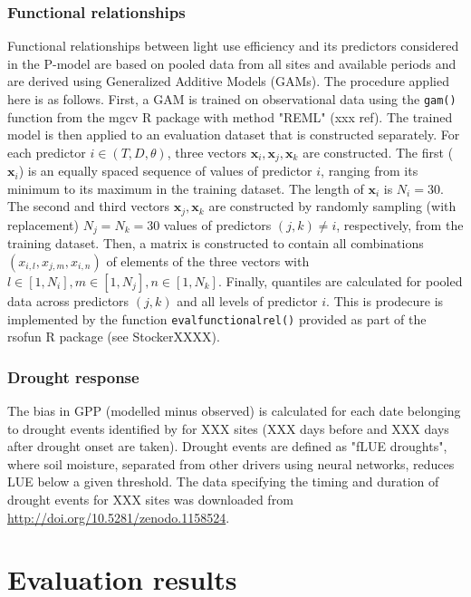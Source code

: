 \documentclass{myreport}
\begin{document}
\subsubsection{Functional relationships}
\label{sec:gam}

Functional relationships between light use efficiency and its predictors considered in the P-model are based on pooled data from all sites and available periods and are derived using Generalized Additive Models (GAMs). The procedure applied here is as follows. First, a GAM is trained on observational data using the \texttt{gam()}  function from the mgcv R package with method "REML" (xxx ref). The trained model is then applied to an evaluation dataset that is constructed separately. For each predictor $i \in (T, D, \theta)$, three vectors $\mathbf{x}_i, \mathbf{x}_j, \mathbf{x}_k$ are constructed. The first ($\mathbf{x}_i$) is an equally spaced sequence of values of predictor $i$, ranging from its minimum to its maximum in the training dataset. The length of $\mathbf{x}_i$ is $N_i=30$. The second and third vectors $\mathbf{x}_j, \mathbf{x}_k$ are constructed by randomly sampling (with replacement) $N_j=N_k=30$ values of predictors $(j,k)\neq i$, respectively, from the training dataset. Then, a matrix is constructed to contain all combinations $(x_{i,l}, x_{j,m}, x_{i,n})$ of elements of the three vectors with $l \in [1,N_i], m \in [1,N_j], n \in [1,N_k]$. Finally, quantiles are calculated for pooled data across predictors $(j,k)$ and all levels of predictor $i$. This is prodecure is implemented by the function \texttt{eval\textunderscore functionalrel()} provided as part of the rsofun R package (see StockerXXXX).

\subsubsection{Drought response}
\label{sec:droughtresponse}
The bias in GPP (modelled minus observed) is calculated for each date belonging to drought events identified by \cite{Stocker2018newphyt} for XXX sites (XXX days before and XXX days after drought onset are taken). Drought events are defined as "fLUE droughts", where soil moisture, separated from other drivers using neural networks, reduces LUE below a given threshold.  The data specifying the timing and duration of drought events for XXX sites was downloaded from \url{http://doi.org/10.5281/zenodo.1158524}. 

\section{Evaluation results}
\end{document}

